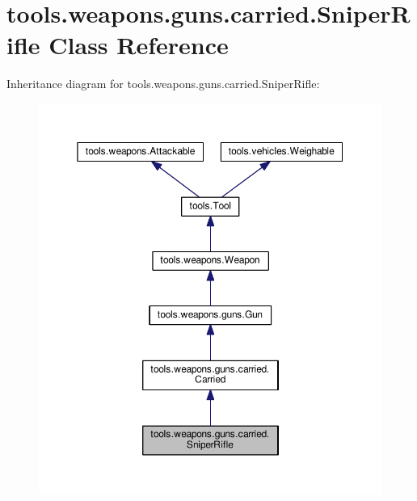 \hypertarget{classtools_1_1weapons_1_1guns_1_1carried_1_1_sniper_rifle}{}\section{tools.\+weapons.\+guns.\+carried.\+Sniper\+Rifle Class Reference}
\label{classtools_1_1weapons_1_1guns_1_1carried_1_1_sniper_rifle}


Inheritance diagram for tools.\+weapons.\+guns.\+carried.\+Sniper\+Rifle\+:
\nopagebreak
\begin{figure}[H]
\begin{center}
\leavevmode
\includegraphics[width=350pt]{classtools_1_1weapons_1_1guns_1_1carried_1_1_sniper_rifle__inherit__graph}
\end{center}
\end{figure}


